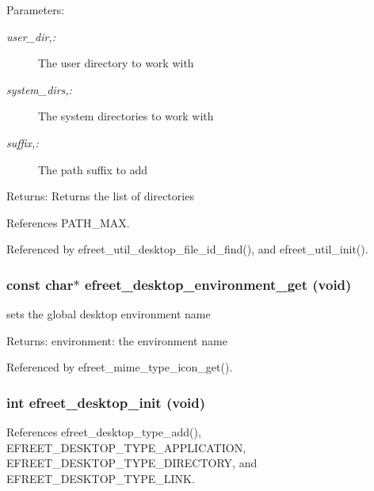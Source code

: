 \begin{Desc}
\item[Parameters:]
\begin{description}
\item[{\em user\_\-dir,:}]The user directory to work with \item[{\em system\_\-dirs,:}]The system directories to work with \item[{\em suffix,:}]The path suffix to add \end{description}
\end{Desc}
\begin{Desc}
\item[Returns:]Returns the list of directories \end{Desc}


References PATH\_\-MAX.

Referenced by efreet\_\-util\_\-desktop\_\-file\_\-id\_\-find(), and efreet\_\-util\_\-init().
\subsubsection{\setlength{\rightskip}{0pt plus 5cm}const char$\ast$ efreet\_\-desktop\_\-environment\_\-get (void)}\label{group__Efreet__Private_g1d9bd595ec6834a484d4e937db836c57}


sets the global desktop environment name 

\begin{Desc}
\item[Returns:]environment: the environment name \end{Desc}


Referenced by efreet\_\-mime\_\-type\_\-icon\_\-get().
\subsubsection{\setlength{\rightskip}{0pt plus 5cm}int efreet\_\-desktop\_\-init (void)}\label{group__Efreet__Private_g1cc25fc125fb1efc462b17b85088bd46}




References efreet\_\-desktop\_\-type\_\-add(), EFREET\_\-DESKTOP\_\-TYPE\_\-APPLICATION, EFREET\_\-DESKTOP\_\-TYPE\_\-DIRECTORY, and EFREET\_\-DESKTOP\_\-TYPE\_\-LINK.


